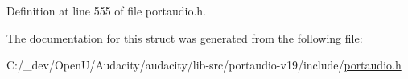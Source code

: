 Definition at line 555 of file portaudio.\+h.



The documentation for this struct was generated from the following file\+:\begin{DoxyCompactItemize}
\item 
C\+:/\+\_\+dev/\+Open\+U/\+Audacity/audacity/lib-\/src/portaudio-\/v19/include/\hyperlink{portaudio_8h}{portaudio.\+h}\end{DoxyCompactItemize}

